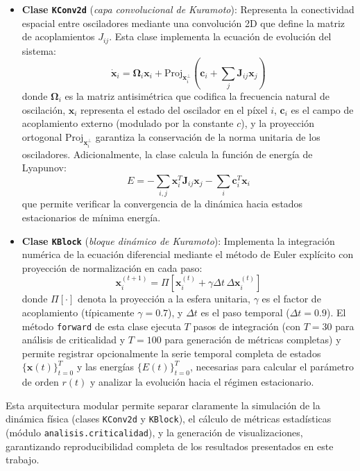\documentclass[12pt]{article}
\begin{document}
\begin{itemize}
    \item \textbf{Clase \texttt{KConv2d}} (\emph{capa convolucional de Kuramoto}): Representa la conectividad espacial entre osciladores mediante una convolución 2D que define la matriz de acoplamientos \(J_{ij}\). Esta clase implementa la ecuación de evolución del sistema:
    \[
    \dot{\mathbf{x}}_i = \boldsymbol{\Omega}_i \mathbf{x}_i + \text{Proj}_{\mathbf{x}_i^\perp} \left( \mathbf{c}_i + \sum_j \mathbf{J}_{ij} \mathbf{x}_j \right)
    \]
    donde \(\boldsymbol{\Omega}_i\) es la matriz antisimétrica que codifica la frecuencia natural de oscilación, \(\mathbf{x}_i\) representa el estado del oscilador en el píxel \(i\), \(\mathbf{c}_i\) es el campo de acoplamiento externo (modulado por la constante \(c\)), y la proyección ortogonal \(\text{Proj}_{\mathbf{x}_i^\perp}\) garantiza la conservación de la norma unitaria de los osciladores. Adicionalmente, la clase calcula la función de energía de Lyapunov:
    \[
    E = -\sum_{i,j} \mathbf{x}_i^T \mathbf{J}_{ij} \mathbf{x}_j - \sum_i \mathbf{c}_i^T \mathbf{x}_i
    \]
    que permite verificar la convergencia de la dinámica hacia estados estacionarios de mínima energía.

    \item \textbf{Clase \texttt{KBlock}} (\emph{bloque dinámico de Kuramoto}): Implementa la integración numérica de la ecuación diferencial mediante el método de Euler explícito con proyección de normalización en cada paso:
    \[
    \mathbf{x}_i^{(t+1)} = \Pi \left[ \mathbf{x}_i^{(t)} + \gamma \Delta t \, \Delta \mathbf{x}_i^{(t)} \right]
    \]
    donde \(\Pi[\cdot]\) denota la proyección a la esfera unitaria, \(\gamma\) es el factor de acoplamiento (típicamente \(\gamma = 0.7\)), y \(\Delta t\) es el paso temporal (\(\Delta t = 0.9\)). El método \texttt{forward} de esta clase ejecuta \(T\) pasos de integración (con \(T = 30\) para análisis de criticalidad y \(T = 100\) para generación de métricas completas) y permite registrar opcionalmente la serie temporal completa de estados \(\{\mathbf{x}(t)\}_{t=0}^T\) y las energías \(\{E(t)\}_{t=0}^T\), necesarias para calcular el parámetro de orden \(r(t)\) y analizar la evolución hacia el régimen estacionario.
\end{itemize}

Esta arquitectura modular permite separar claramente la simulación de la dinámica física (clases \texttt{KConv2d} y \texttt{KBlock}), el cálculo de métricas estadísticas (módulo \texttt{analisis.criticalidad}), y la generación de visualizaciones, garantizando reproducibilidad completa de los resultados presentados en este trabajo.
\end{document}
